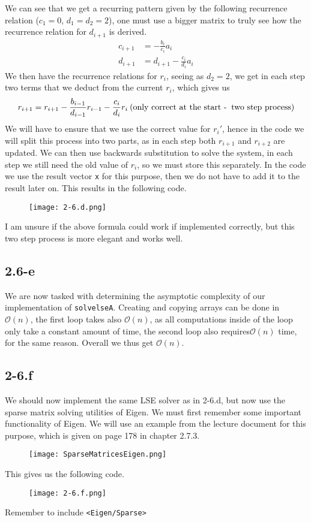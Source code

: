 \documentclass{article}
\begin{document}
\pagebreak

 \noindent We can see that we get a recurring pattern given by the following recurrence relation ($c_{1}=0$, $d_{1} = d_{2} = 2$), one must use a bigger matrix to truly see how the recurrence relation for $d_{i+1}$ is derived.
 \begin{align*}
     c_{i+1} &= -\frac{b_{i}}{c_{i}}a_{i} \\
     d_{i+1} &= d_{i + 1} - \frac{c_{i}}{d_{i}}a_{i} 
 \end{align*}
 We then have the recurrence relations for $r_{i}$, seeing as $d_{2} = 2$, we get in each step two terms that we deduct from the current $r_{i}$, which gives us
 \begin{equation*}
     r_{i+1} = r_{i+1} - \frac{b_{i -1}}{d_{i - 1}}r_{i - 1}- \frac{c_{i}}{d_{i}}r_{i}  \: \text{(only correct at the start -\> two step process)}
 \end{equation*}
We will have to ensure that we use  the correct value for $r_{i}'$, hence in the code we will split this process into two parts, as in each step both $r_{i+1}$ and $r_{i+2}$ are updated. We can then use backwards substitution to solve the system, in each step we still need the old value of $r_{i}$, so we must store this separately. In the code we use the result vector \verb|x| for this purpose, then we do not have to add it to the result later on. This results in the following code.
\begin{figure}[!hbt]
    \centering
\texttt{[image: 2-6.d.png]}
\end{figure}
I am unsure if the above formula could work if implemented correctly, but this two step process is more elegant and works well.

\pagebreak

\subsection*{2.6-e} 
We are now tasked with determining the asymptotic complexity of our implementation of \verb|solvelseA|. Creating and copying arrays can be done in $\mathcal{O}\left(n\right)$, the first loop takes also $\mathcal{O}\left(n\right)$, as all computations inside of the loop only take a constant amount of time, the second loop also requires$\mathcal{O}\left(n\right)$ time, for the same reason. Overall we thus get $\mathcal{O}\left(n\right)$. 

\subsection*{2-6.f} 
We should now implement the same LSE solver as in 2-6.d, but now use the sparse matrix solving utilities of Eigen. We must first remember some important functionality of Eigen. We will use an example from the lecture document for this purpose, which is given on page 178  in chapter 2.7.3.

\begin{figure}[!hbt]
    \centering
\texttt{[image: SparseMatricesEigen.png]}
\end{figure}
\noindent This gives us the following code.

\begin{figure}[!hbt]
    \centering
\texttt{[image: 2-6.f.png]}
\end{figure}
Remember to include \verb|<Eigen/Sparse>|
\end{document}
